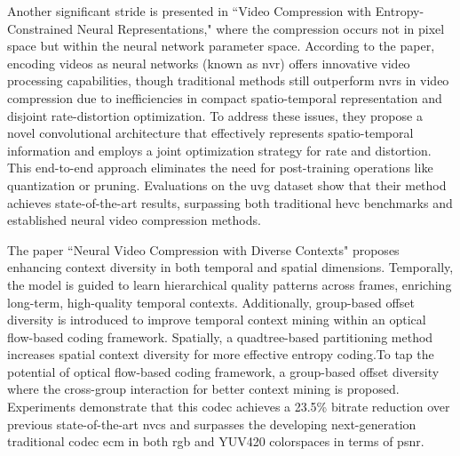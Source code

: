 \documentclass{ioereport}
\begin{document}
Another significant stride is presented in ``Video Compression with Entropy-Constrained Neural Representations," \cite{Gomes_2023_CVPR} where the compression occurs not in pixel space but within the neural network parameter space. According to the paper, encoding videos as neural networks (known as \gls{nvr}) offers innovative video processing capabilities, though traditional methods still outperform \gls{nvr}s in video compression due to inefficiencies in compact spatio-temporal representation and disjoint rate-distortion optimization. To address these issues, they propose a novel convolutional architecture that effectively represents spatio-temporal information and employs a joint optimization strategy for rate and distortion. This end-to-end approach eliminates the need for post-training operations like quantization or pruning. Evaluations on the \gls{uvg} dataset show that their method achieves state-of-the-art results, surpassing both traditional \gls{hevc} benchmarks and established neural video compression methods. 

The paper ``Neural Video Compression with Diverse Contexts" \cite{li2023neural} proposes enhancing context diversity in both temporal and spatial dimensions. Temporally, the model is guided to learn hierarchical quality patterns across frames, enriching long-term, high-quality temporal contexts. Additionally, group-based offset diversity is introduced to improve temporal context mining within an optical flow-based coding framework. Spatially, a quadtree-based partitioning method increases spatial context diversity for more effective entropy coding.To tap the potential of optical flow-based coding framework, a group-based offset diversity where the cross-group interaction for better context mining is proposed. Experiments demonstrate that this \gls{codec} achieves a 23.5\% bitrate reduction over previous state-of-the-art \gls{nvc}s and surpasses the developing next-generation traditional \gls{codec} \gls{ecm} in both \gls{rgb} and YUV420 colorspaces in terms of \gls{psnr}. 
\end{document}
